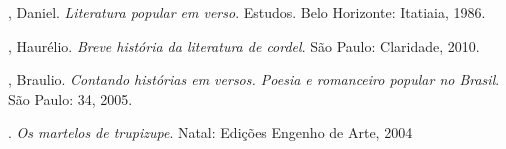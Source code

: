 


\begin{bibliohedra}

, Daniel. \textit{Literatura popular em verso}. Estudos. Belo Horizonte: Itatiaia, 1986. 

, Haurélio. \textit{Breve história da literatura de cordel}. São Paulo: Claridade, 2010.

, Braulio. \textit{Contando histórias em versos. Poesia e romanceiro popular 
no Brasil}. São Paulo: 34, 2005.

\titidem. \textit{Os martelos de trupizupe}. Natal: Edições Engenho de Arte, 2004


\end{bibliohedra}